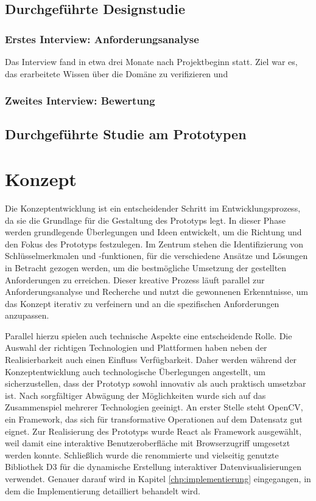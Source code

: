 \documentclass[
  ngerman,
  a4paper,  %
  twoside,  %
  bibliography=totoc,
  headsepline,
  cleardoublepage=empty,
  parskip=half,
  draft=false
]{scrbook}
\begin{document}
\section{Durchgeführte Designstudie}



\subsection{Erstes Interview: Anforderungsanalyse}
Das Interview fand in etwa drei Monate nach Projektbeginn statt. Ziel war es, das erarbeitete Wissen über die Domäne zu verifizieren und
\subsection{Zweites Interview: Bewertung}
\section{Durchgeführte Studie am Prototypen}

\chapter{Konzept}
Die Konzeptentwicklung ist ein entscheidender Schritt im Entwicklungsprozess, da sie die Grundlage für die Gestaltung des Prototyps legt. In dieser Phase werden grundlegende Überlegungen und Ideen entwickelt, um die Richtung und den Fokus des Prototyps festzulegen. Im Zentrum stehen die Identifizierung von Schlüsselmerkmalen und -funktionen, für die verschiedene Ansätze und Lösungen in Betracht gezogen werden, um die bestmögliche Umsetzung der gestellten Anforderungen zu erreichen. Dieser kreative Prozess läuft parallel zur Anforderungsanalyse und Recherche und nutzt die gewonnenen Erkenntnisse, um das Konzept iterativ zu verfeinern und an die spezifischen Anforderungen anzupassen.

Parallel hierzu spielen auch technische Aspekte eine entscheidende Rolle. Die Auswahl der richtigen Technologien und Plattformen haben neben der Realisierbarkeit auch einen Einfluss Verfügbarkeit. Daher werden während der Konzeptentwicklung auch technologische Überlegungen angestellt, um sicherzustellen, dass der Prototyp sowohl innovativ als auch praktisch umsetzbar ist. Nach sorgfältiger Abwägung der Möglichkeiten wurde sich auf das Zusammenspiel mehrerer Technologien geeinigt. An erster Stelle steht OpenCV, ein Framework, das sich für transformative Operationen auf dem Datensatz gut eignet. Zur Realisierung des Prototyps wurde React als Framework ausgewählt, weil damit eine interaktive Benutzeroberfläche mit Browserzugriff umgesetzt werden konnte. Schließlich wurde die renommierte und vielseitig genutzte Bibliothek D3 für die dynamische Erstellung interaktiver Datenvisualisierungen verwendet. Genauer darauf wird in Kapitel \ref{chp:implementierung} eingegangen, in dem die Implementierung detailliert behandelt wird.
\end{document}

